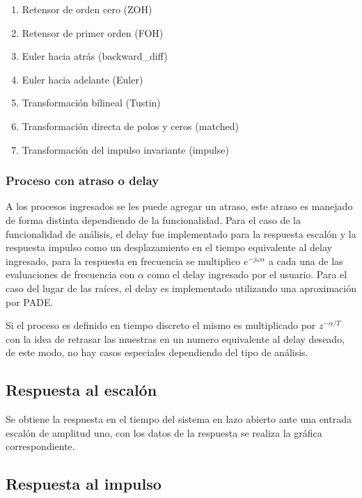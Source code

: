         \begin{enumerate}[leftmargin=\parindent]
            \item Retensor de orden cero  (ZOH)
            \item Retensor de primer orden (FOH)
            \item Euler hacia atrás (backward\_diff)
            \item Euler hacia adelante (Euler)
            \item Transformación bilineal (Tustin)
            \item Transformación directa de polos y ceros (matched)
            \item Transformación del impulso invariante (impulse)
        \end{enumerate}

    \subsubsection{Proceso con atraso o delay}
        
        A los procesos ingresados se les puede agregar un atraso, este atraso es manejado de forma distinta dependiendo de la funcionalidad. Para el caso de la funcionalidad de análisis, el delay fue implementado para la respuesta escalón y la respuesta impulso como un desplazamiento en el tiempo equivalente al delay ingresado, para la respuesta en frecuencia se multiplico $e^{-j\omega \alpha}$ a cada una de las evaluaciones de frecuencia con $\alpha$ como el delay ingresado por el usuario. Para el caso del lugar de las raíces, el delay es implementado utilizando una aproximación por PADE.

        Si el proceso es definido en tiempo discreto el mismo es multiplicado por $z^{-\alpha/T}$ con la idea de retrasar las muestras en un numero equivalente al delay deseado, de este modo, no hay casos especiales dependiendo del tipo de análisis.

    \subsection{Respuesta al escalón}
        
        Se obtiene la respuesta en el tiempo del sistema en lazo abierto ante una entrada escalón de amplitud uno, con los datos de la respuesta se realiza la gráfica correspondiente.
    
    \subsection{Respuesta al impulso}
        
